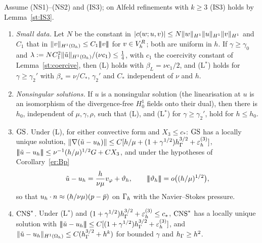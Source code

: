 \begin{corollary}\label{ns:cor}
Assume (NS1)--(NS2) and (IS3); on Alfeld refinements with $k\ge3$ (IS3) holds by Lemma~\ref{st:IS3}.
\begin{enumerate}[label=(\roman*)]
\item \emph{Small data.} Let $N$ be the constant in $|c(w;u,v)|\le N\lVert w\rVert_{H^1}\lVert u\rVert_{H^1}\lVert v\rVert_{H^1}$ and $C_1$ that in $\lVert v\rVert_{H^1(\Omega_h)}\le C_1|\!|\!|v|\!|\!|$ for $v\in V_h^R$; both are uniform in $h$. If $\gamma\ge\gamma_0$ and $\lambda:=NC_1^2\lVert \tilde u\rVert_{H^1(\Omega_h)}/(\nu c_1)\le\frac14$, with $c_1$ the coercivity constant of Lemma~\ref{st:coercive}, then (L) holds with $\beta_L=\nu c_1/2$, and (L$^\ast$) holds for $\gamma\ge\gamma_2'$ with $\beta_\ast=\nu/C_\ast$, $\gamma_2'$ and $C_\ast$ independent of $\nu$ and $h$.
\item \emph{Nonsingular solutions.} If $u$ is a nonsingular solution (the linearisation at $u$ is an isomorphism of the divergence-free $H^1_0$ fields onto their dual), then there is $h_0$, independent of $\mu,\gamma,\rho$, such that (L), and (L$^\ast$) for $\gamma\ge\gamma_2'$, hold for $h\le h_0$.
\item \emph{$\mathrm{GS}$.} Under (L), for either convective form and $X_3\le c_\ast$: $\mathrm{GS}$ has a locally unique solution, $\lVert \nabla(\tilde u-u_h)\rVert\le C[h/\mu+(1+\gamma^{1/2})h_\Gamma^{3/2}+\varepsilon_h^{(3)}]$, $|\!|\!|\tilde u-u_h|\!|\!|\le\nu^{-1}(h/\mu)^{1/2}G+CX_3$, and under the hypotheses of Corollary~\ref{er:Bp}
\[
\tilde u-u_h=\frac h{\nu\mu}v_\varphi+\vartheta_h,\qquad|\!|\!|\vartheta_h|\!|\!|=o\bigl((h/\mu)^{1/2}\bigr),
\]
so that $u_h\cdot n\approx(h/\nu\mu)(p-\bar p)$ on $\Gamma_h$ with the Navier--Stokes pressure.
\item \emph{$\mathrm{CNS}^\ast$.} Under (L$^\ast$) and $(1+\gamma^{1/2})h_\Gamma^{3/2}+\varepsilon_h^{(3)}\le c_\ast$, $\mathrm{CNS}^\ast$ has a locally unique solution with $|\!|\!|\tilde u-u_h|\!|\!|\le C[(1+\gamma^{1/2})h_\Gamma^{3/2}+\varepsilon_h^{(3)}]$, and $\lVert \tilde u-u_h\rVert_{H^1(\Omega_h)}\le C(h_\Gamma^{3/2}+h^k)$ for bounded $\gamma$ and $h_\Gamma\ge h^2$.
\end{enumerate}
\end{corollary}

